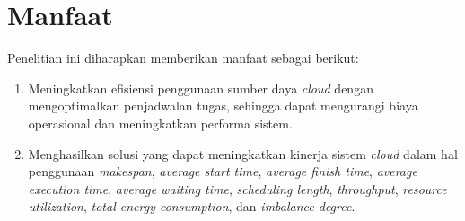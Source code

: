\section{Manfaat}
Penelitian ini diharapkan memberikan manfaat sebagai berikut:
\begin{enumerate} [nolistsep]
    \item Meningkatkan efisiensi penggunaan sumber daya \textit{cloud} dengan mengoptimalkan penjadwalan tugas, sehingga dapat mengurangi biaya operasional dan meningkatkan performa sistem.
    \item Menghasilkan solusi yang dapat meningkatkan kinerja sistem \textit{cloud} dalam hal penggunaan \textit{makespan},\textit{ average start time}, \textit{average finish time}, \textit{average execution time}, \textit{average waiting time}, \textit{scheduling length}, \textit{throughput}, \textit{resource utilization}, \textit{total energy consumption}, dan \textit{imbalance degree}.
\end{enumerate}